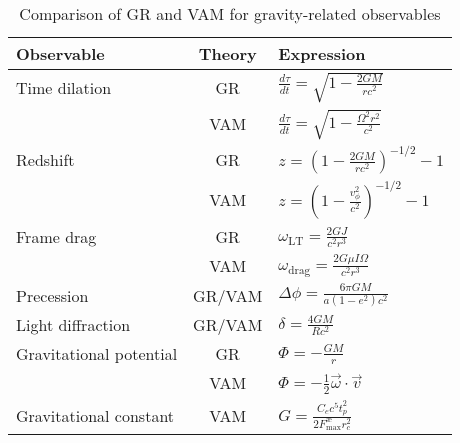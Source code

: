 \begin{table}[ht]
    \centering
    \caption{Comparison of GR and VAM for gravity-related observables}
    \label{tab:VAM-GR}
    \begin{tabular}{|l|c|l|}
        \hline
        \textbf{Observable} & \textbf{Theory} & \textbf{Expression} \\
        \hline
        Time dilation & GR & $ \frac{d\tau}{dt} = \sqrt{1 - \frac{2GM}{rc^2}} $ \\
        & VAM & $ \frac{d\tau}{dt} = \sqrt{1 - \frac{\Omega^2 r^2}{c^2}} $ \\
        \hline
        Redshift & GR & $ z = \left(1 - \frac{2GM}{rc^2} \right)^{-1/2} - 1 $ \\
        & VAM & $ z = \left(1 - \frac{v_\phi^2}{c^2} \right)^{-1/2} - 1 $ \\
        \hline
        Frame drag & GR & $ \omega_\text{LT} = \frac{2GJ}{c^2 r^3} $ \\
        & VAM & $ \omega_\text{drag} = \frac{2G \mu I \Omega}{c^2 r^3} $ \\
        \hline
        Precession & GR/VAM & $ \Delta\phi = \frac{6\pi GM}{a(1 - e^2)c^2} $ \\
        \hline
        Light diffraction & GR/VAM & $ \delta = \frac{4GM}{Rc^2} $ \\
        \hline
        Gravitational potential & GR & $ \Phi = -\frac{GM}{r} $ \\
        & VAM & $ \Phi = -\frac{1}{2} \vec{\omega} \cdot \vec{v} $ \\
        \hline
        Gravitational constant & VAM & $ G = \frac{C_e c^5 t_p^2}{2 F^{\text{\ae}}_{\text{max}} r_c^2} $ \\
        \hline
    \end{tabular}
\end{table}

